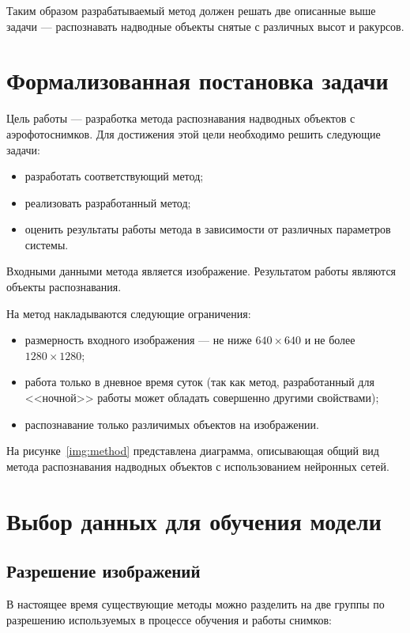 Таким образом разрабатываемый метод должен решать две описанные выше задачи --- распознавать надводные объекты снятые с различных высот и ракурсов.

\section{Формализованная постановка задачи}

Цель работы --- разработка метода распознавания надводных объектов с аэрофотоснимков. Для достижения этой цели необходимо решить следующие задачи:
\begin{itemize}[label=---]
    \item разработать соответствующий метод;
    \item реализовать разработанный метод;
    \item оценить результаты работы метода в зависимости от различных параметров системы.
\end{itemize}

Входными данными метода является изображение. Результатом работы являются объекты распознавания.

На метод накладываются следующие ограничения:
\begin{itemize}[label=---]
    \item размерность входного изображения --- не ниже $640 \times 640$ и не более $1280 \times 1280$;
    \item работа только в дневное время суток (так как метод, разработанный для <<ночной>> работы может обладать совершенно другими свойствами);
    \item распознавание только различимых объектов на изображении.
\end{itemize}

На рисунке~\ref{img:method} представлена диаграмма, описывающая общий вид метода распознавания надводных объектов с использованием нейронных сетей.


\section{Выбор данных для обучения модели}

\subsection{Разрешение изображений}

В настоящее время существующие методы можно разделить на две группы по разрешению используемых в процессе обучения и работы снимков:

